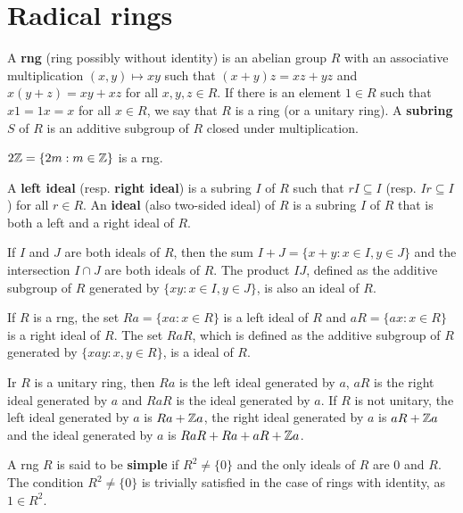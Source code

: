 \chapter{Radical rings}

A \textbf{rng} (ring possibly without identity) 
is an abelian group $R$ with an associative multiplication 
$(x,y)\mapsto xy$ such that $(x+y)z=xz+yz$ and $x(y+z)=xy+xz$ for all $x,y,z\in
R$. If there is an element $1\in R$ such that $x1=1x=x$ for all $x\in R$, we 
say that $R$ is a ring (or a unitary ring).  A \textbf{subring} $S$ of $R$ is an additive
subgroup of $R$ closed under multiplication. 

\begin{example}
	$2\mathbb{Z}=\{2m:m\in\mathbb{Z}\}$ is a rng.  
\end{example}

A \textbf{left ideal} (resp. \textbf{right ideal}) is a subring $I$ of $R$ such that 
$rI\subseteq I$ (resp. $Ir\subseteq I$) for all $r\in R$. An \textbf{ideal}
(also two-sided ideal) of $R$ is a subring $I$ of $R$ that is both a left and a right ideal of $R$.

\begin{example}
If $I$ and $J$ are both ideals of $R$, then the sum $I+J=\{x+y:x\in I,y\in J\}$ and
the intersection $I\cap J$ are both ideals of $R$. The product $IJ$, defined as the additive
subgroup of $R$ generated by $\{xy:x\in I,y\in J\}$, is also an ideal of $R$. 
\end{example}

\begin{example}
If $R$ is a rng, the set $Ra =\{xa: x\in R\}$ is a left ideal
of $R$ and $aR =\{ax: x\in R\}$ is a right ideal of $R$. The set $RaR$, which is
defined as the additive subgroup of $R$ generated by $\{xay: x, y\in R\}$, is a
ideal of $R$.
\end{example}

\begin{example}
	Ir $R$ is a unitary ring, then $Ra$ is the left ideal generated by $a$, $aR$ is
	the right ideal generated by $a$ and $RaR$ is the ideal generated by $a$. 
	If $R$ is not unitary, the left ideal generated by $a$ is $Ra+\mathbb{Z} a$,
	the right ideal generated by $a$ is $aR+\mathbb{Z} a$ and the ideal generated by 
	$a$ is $RaR+Ra+aR+\mathbb{Z} a$.
\end{example}

A rng $R$ is said to be \textbf{simple} if $R^2\ne\{0\}$ and the only ideals of 
$R$ are $0$ and $R$. The condition $R^2\ne\{0\}$ is trivially satisfied in the case of rings
with identity, as $1\in R^2$. 

